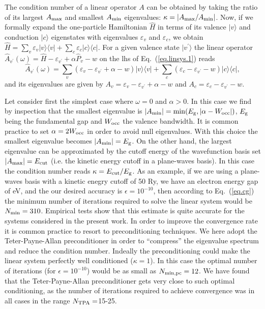 \documentclass[twocolumn,prb,showpacs,superscriptaddress]{revtex4}
\def\w{\omega}
\def\>{\rangle}
\def\<{\langle}
\def\H{\hat{H}}
\def\E{\varepsilon}
\def\vp{{v^\prime}}
\begin{document}
The condition number of a linear operator $A$ can be obtained by taking the ratio 
of its largest $A_{\rm max}$ and smallest $A_{\rm min}$ eigenvalues: 
$\kappa=|A_{\rm max}/A_{\rm min}|$.
Now, if we formally expand the one-particle Hamiltonian $\H$ in terms of its valence 
$|v\>$ and conduction $|c\>$ eigenstates with eigenvalues $\E_v$ and $\E_c$, we obtain
$\H = \sum_v \E_v |v\>\<v| + \sum_c \E_c |c\>\<c|$. For a given valence state 
$|v^\prime\>$ the linear operator $\hat{A}_\vp (\w) = \H - \E_\vp + \alpha \hat{P}_v - w$ 
on the lhs of Eq.\ (\ref{eq.linsys.1}) reads
  \begin{equation}
  \hat{A}_\vp (\w)  = 
  \sum_v ( \E_v - \E_\vp + \alpha - w ) |v\>\<v| 
  + \sum_c ( \E_c - \E_\vp - w ) |c\>\<c|,
  \end{equation}
and its eigenvalues are given by $A_v = \E_v - \E_\vp + \alpha - w$ and
$A_c = \E_c - \E_\vp - w$. 

Let consider first the simplest case where $\w=0$ and $\alpha>0$. In this case 
we find by inspection that the smallest eigenvalue is $|A_{\rm min}|= \min(E_{\rm g}, |\alpha-W_{\rm occ}|)$, 
$E_{\rm g}$ being the fundamental gap and $W_{\rm occ}$ the valence bandwidth.
It is common practice to set $\alpha=2W_{\rm occ}$ in order to avoid null eigenvalues.
\cite{baroni.rmp} With this choice the smallest eigenvalue becomes $|A_{\rm min}|=E_{\rm g}$.
On the other hand, the largest eigenvalue can be approximated by the
cutoff energy of the wavefunction basis set $|A_{\rm max}|=E_{\rm cut}$
(i.e. the kinetic energy cutoff in a plane-waves basis).
In this case the condition number reads $\kappa = E_{\rm cut}/E_{\rm g}$.
As an example, if we are using a plane-waves basis with a kinetic enegry
cutoff of 50 Ry, we have an electron energy gap of eV, 
and the our desired accuracy is $\epsilon=10^{-10}$, then according to
Eq.\ (\ref{eq.cg}) the minimum number of iterations required to solve 
the linear system would be $N_{\rm min} = 310$. Empirical tests show that 
this estimate is quite accurate for the systems considered in the present work.
In order to improve the convergence rate it is common practice to resort to preconditioning
techniques. We here adopt the Teter-Payne-Allan preconditioner\cite{tpa}
in order to ``compress'' the eigenvalue spectrum and reduce the
condition number. Indeally the preconditioning could make the linear
system perfectly well conditioned ($\kappa=1$). In this case
the optimal  number of iterations (for $\epsilon=10^{-10}$) would be as small
as $N_{\rm min,pc} = 12$. We have found that the Teter-Payne-Allan preconditioner
gets very close to such optimal conditioning, as the number of iterations
required to achieve convergence was in all cases in the range $N_{\rm TPA}=$15-25. 
\end{document}
